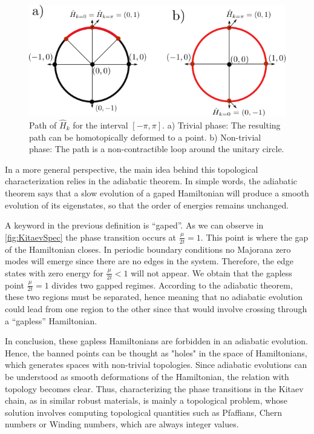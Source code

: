 \begin{figure}[t]
    \centering
    \includegraphics[scale=0.8]{IMAGES/Majorana/Topological.png}
    \caption{ \label{fig:topological}  Path of $\hat{H}_k$ for the interval $[ -\pi, \pi ]$. a) Trivial phase: The resulting path can be homotopically deformed to a point. b) Non-trivial phase: The path is a non-contractible loop around the unitary circle. \protect {}} 
\end{figure}


In a more general perspective, the main idea behind this topological characterization relies in the adiabatic theorem.  In simple words, the adiabatic theorem says that a slow evolution of a gaped Hamiltonian will produce a smooth evolution of its  eigenstates, so that the order of energies remains unchanged. 

A keyword in the previous definition is ``gaped''. As we can observe in  \ref{fig:KitaevSpec} the phase transition occurs at $\frac{\mu}{2t}=1$. This point is where  the gap of the Hamiltonian closes. In periodic boundary conditions no Majorana zero modes will emerge since there are no edges in the system. Therefore, the edge states with zero energy for $\frac{\mu}{2t}<1$ will not appear. We obtain that the gapless point $\frac{\mu}{2t}=1$ divides two gapped regimes. According to the adiabatic theorem, these two regions must be separated, hence meaning that no adiabatic evolution could lead from one region to the other since that would involve crossing  through a ``gapless'' Hamiltonian. 


In conclusion, these gapless Hamiltonians are forbidden in an adiabatic evolution. Hence, the banned points can be thought as "holes" in the space of Hamiltonians, which generates spaces with non-trivial topologies. Since adiabatic evolutions can be understood as smooth deformations of the Hamiltonian, the relation with topology becomes clear.  Thus, characterizing the phase transitions in the Kitaev chain, as in similar robust materials,  is mainly a topological problem, whose solution involves computing topological quantities such as Pfaffians, Chern numbers or Winding numbers, which are always integer values. 

